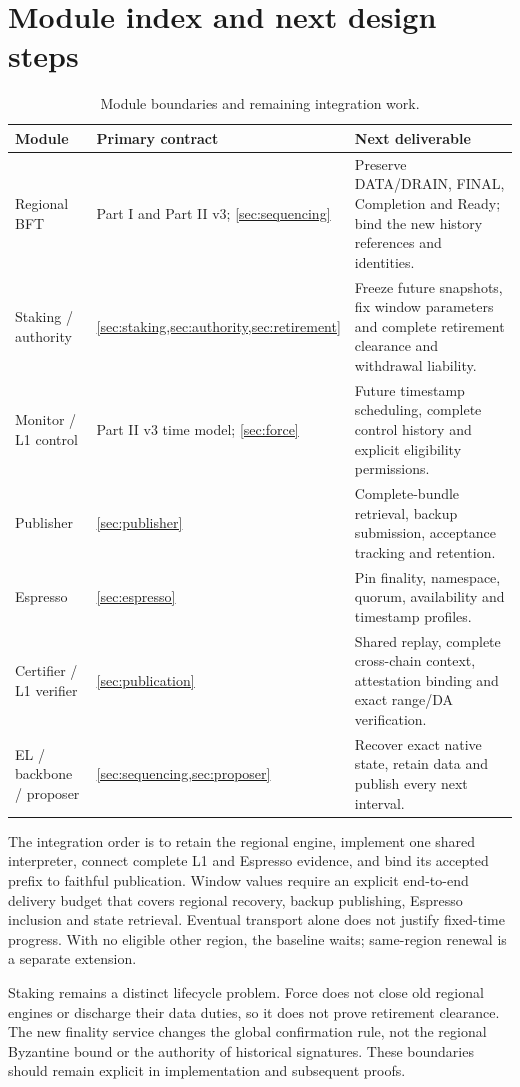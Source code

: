 \documentclass[11pt,a4paper]{article}
\begin{document}
\section{Module index and next design steps}\label{sec:index}
\begin{table}[H]\centering\small
\begin{tabularx}{\linewidth}{@{}p{.22\linewidth}Y Y@{}}
\toprule Module & Primary contract & Next deliverable\\\midrule
Regional BFT & Part I and Part II v3; \cref{sec:sequencing}
& Preserve DATA/DRAIN, FINAL, Completion and Ready; bind the new history
references and identities.\\
Staking / authority & \cref{sec:staking,sec:authority,sec:retirement}
& Freeze future snapshots, fix window parameters and complete retirement
clearance and withdrawal liability.\\
Monitor / L1 control & Part II v3 time model; \cref{sec:force}
& Future timestamp scheduling, complete control history and explicit
eligibility permissions.\\
Publisher & \cref{sec:publisher}
& Complete-bundle retrieval, backup submission, acceptance tracking and
retention.\\
Espresso & \cref{sec:espresso}
& Pin finality, namespace, quorum, availability and timestamp profiles.\\
Certifier / L1 verifier & \cref{sec:publication}
& Shared replay, complete cross-chain context, attestation binding and
exact range/DA verification.\\
EL / backbone / proposer & \cref{sec:sequencing,sec:proposer}
& Recover exact native state, retain data and publish every next interval.\\\bottomrule
\end{tabularx}
\caption{Module boundaries and remaining integration work.}
\end{table}

The integration order is to retain the regional engine, implement one
shared interpreter, connect complete L1 and Espresso evidence, and bind
its accepted prefix to faithful publication. Window values require an
explicit end-to-end delivery budget that covers regional recovery,
backup publishing, Espresso inclusion and state retrieval. Eventual
transport alone does not justify fixed-time progress. With no eligible
other region, the baseline waits; same-region renewal is a separate
extension.

Staking remains a distinct lifecycle problem. Force does not close old
regional engines or discharge their data duties, so it does not prove
retirement clearance. The new finality service changes the global
confirmation rule, not the regional Byzantine bound or the authority
of historical signatures. These boundaries should remain explicit in
implementation and subsequent proofs.
\end{document}
